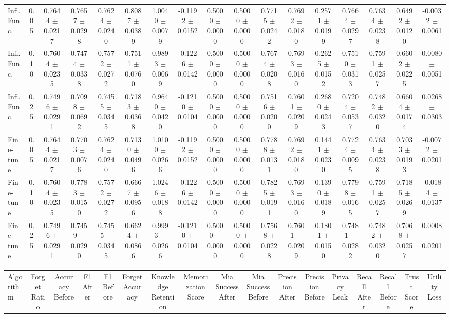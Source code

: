 \begin{table}[t]
\begin{tabular}{lcccccccccccccccc}
Infl. Func. & 0.05 & 0.7644 $\pm$ 0.0217 & 0.7657 $\pm$ 0.0298 & 0.7624 $\pm$ 0.0240 & 0.8087 $\pm$ 0.0389 & 1.0040 $\pm$ 0.0079 & -0.1192 $\pm$ 0.0152 & 0.5000 $\pm$ 0.0000 & 0.5000 $\pm$ 0.0000 & 0.7715 $\pm$ 0.0242 & 0.7692 $\pm$ 0.0180 & 0.2571 $\pm$ 0.0199 & 0.7664 $\pm$ 0.0297 & 0.7634 $\pm$ 0.0238 & 0.6492 $\pm$ 0.0120 & -0.0032 $\pm$ 0.0061 \\
Infl. Func. & 0.10 & 0.7604 $\pm$ 0.0235 & 0.7474 $\pm$ 0.0338 & 0.7572 $\pm$ 0.0272 & 0.7511 $\pm$ 0.0760 & 0.9893 $\pm$ 0.0069 & -0.1226 $\pm$ 0.0142 & 0.5000 $\pm$ 0.0000 & 0.5000 $\pm$ 0.0000 & 0.7674 $\pm$ 0.0208 & 0.7693 $\pm$ 0.0160 & 0.2625 $\pm$ 0.0152 & 0.7510 $\pm$ 0.0313 & 0.7591 $\pm$ 0.0257 & 0.6602 $\pm$ 0.0225 & 0.0080 $\pm$ 0.0051 \\
Infl. Func. & 0.25 & 0.7496 $\pm$ 0.0291 & 0.7098 $\pm$ 0.0692 & 0.7455 $\pm$ 0.0345 & 0.7183 $\pm$ 0.0368 & 0.9640 $\pm$ 0.0420 & -0.1210 $\pm$ 0.0104 & 0.5000 $\pm$ 0.0000 & 0.5000 $\pm$ 0.0000 & 0.7516 $\pm$ 0.0200 & 0.7601 $\pm$ 0.0209 & 0.2680 $\pm$ 0.0243 & 0.7204 $\pm$ 0.0537 & 0.7482 $\pm$ 0.0320 & 0.6604 $\pm$ 0.0174 & 0.0268 $\pm$ 0.0303 \\
Fine-tune & 0.05 & 0.7644 $\pm$ 0.0217 & 0.7703 $\pm$ 0.0076 & 0.7624 $\pm$ 0.0240 & 0.7130 $\pm$ 0.0496 & 1.0100 $\pm$ 0.0266 & -0.1192 $\pm$ 0.0152 & 0.5000 $\pm$ 0.0000 & 0.5000 $\pm$ 0.0000 & 0.7788 $\pm$ 0.0131 & 0.7692 $\pm$ 0.0180 & 0.1441 $\pm$ 0.0230 & 0.7724 $\pm$ 0.0095 & 0.7634 $\pm$ 0.0238 & 0.7033 $\pm$ 0.0193 & -0.0072 $\pm$ 0.0201 \\
Fine-tune & 0.10 & 0.7604 $\pm$ 0.0235 & 0.7783 $\pm$ 0.0150 & 0.7572 $\pm$ 0.0272 & 0.6667 $\pm$ 0.0956 & 1.0246 $\pm$ 0.0188 & -0.1226 $\pm$ 0.0142 & 0.5000 $\pm$ 0.0000 & 0.5000 $\pm$ 0.0000 & 0.7825 $\pm$ 0.0191 & 0.7693 $\pm$ 0.0160 & 0.1390 $\pm$ 0.0189 & 0.7798 $\pm$ 0.0165 & 0.7591 $\pm$ 0.0257 & 0.7185 $\pm$ 0.0269 & -0.0184 $\pm$ 0.0137 \\
Fine-tune & 0.25 & 0.7496 $\pm$ 0.0291 & 0.7459 $\pm$ 0.0290 & 0.7455 $\pm$ 0.0345 & 0.6624 $\pm$ 0.0866 & 0.9993 $\pm$ 0.0266 & -0.1210 $\pm$ 0.0104 & 0.5000 $\pm$ 0.0000 & 0.5000 $\pm$ 0.0000 & 0.7568 $\pm$ 0.0228 & 0.7601 $\pm$ 0.0209 & 0.1801 $\pm$ 0.0150 & 0.7481 $\pm$ 0.0282 & 0.7482 $\pm$ 0.0320 & 0.7068 $\pm$ 0.0257 & 0.0008 $\pm$ 0.0201 \\
\bottomrule
\end{tabular}
\vspace{2mm}
\begin{tabular}{lcccccccccccccccc}
\toprule
Algorithm & Forget Ratio & Accuracy Before & F1 After & F1 Before & Forget Accuracy & Knowledge Retention & Memorization Score & Mia Success After & Mia Success Before & Precision After & Precision Before & Privacy Leak & Recall After & Recall Before & Trust Score & Utility Loss \\

\end{tabular}
\end{table}
